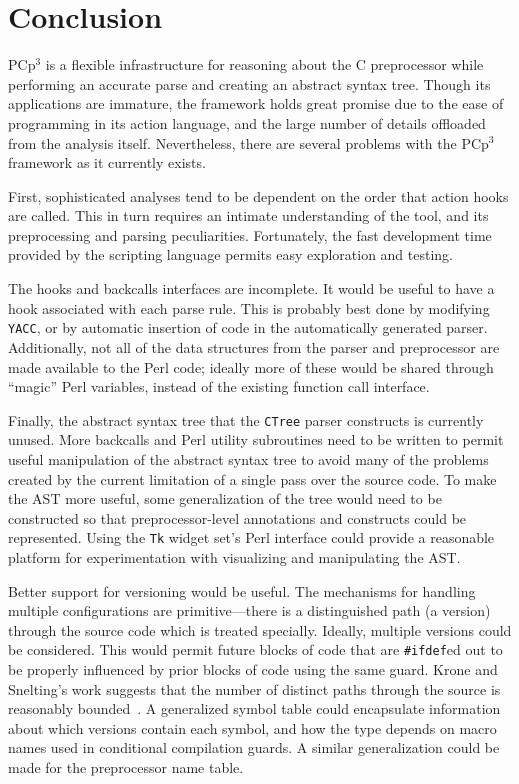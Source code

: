 \documentclass{article}
\newcommand{\pcp}{\mbox{\textsf{PCp}$^3$}}
\newcommand{\Perl}{\mbox{\textsf{Perl}}}
\newcommand{\C}{\mbox{\textsf{C}}}
\newcommand{\ppd}[1]{\texttt{\##1}}
\begin{document}
\section{Conclusion}
\label{sec:conclusion}
\pcp{} is a flexible infrastructure for
reasoning about the \C{} preprocessor while performing an
accurate parse and creating an abstract syntax tree.  Though its
applications are immature, the framework holds great promise due
to the ease of programming in its action language, and the large number
of details offloaded from the analysis itself.  Nevertheless, there are several
problems with the \pcp{} framework as it currently exists.

First, sophisticated analyses tend to be dependent on the order that
action hooks are called.  This in turn requires an intimate
understanding of the tool, and its preprocessing and parsing
peculiarities.  Fortunately, the fast development time provided by the
scripting language permits easy exploration and testing.

The hooks and backcalls interfaces are incomplete.  It would be useful
to have a hook associated with each parse rule.  This is probably best
done by modifying \texttt{YACC}, or by automatic insertion of code in
the automatically generated parser.  Additionally, not all of the data
structures from the parser and preprocessor are made available to the
\Perl{} code;  ideally more of these would be shared through ``magic''
\Perl{} variables, instead of the existing function call interface.

Finally, the abstract syntax tree that the \texttt{CTree} parser
constructs is currently unused.  More backcalls and \Perl{} utility
subroutines need to be written to permit useful manipulation of the
abstract syntax tree to avoid many of the problems created by the current
limitation of a single pass over the source code.  To make the AST
more useful, some generalization of the tree would need to be
constructed so that preprocessor-level annotations and constructs could be
represented.  Using the \texttt{Tk} widget set's \Perl{} interface could
provide a reasonable platform for experimentation with visualizing and
manipulating the AST.


Better support for versioning would be useful. The mechanisms for
handling multiple configurations are primitive---there is a
distinguished path (a version) through the source code which is treated
specially.  Ideally, multiple versions could be considered.  This would
permit future blocks of code that are \ppd{ifdef}ed out to be properly
influenced by prior blocks of code using the same guard.  Krone and
Snelting's work suggests that the number of distinct paths through the
source is reasonably bounded~\cite{Krone94}.  A generalized symbol table
could encapsulate information about which versions contain each symbol,
and how the type depends on macro names used in conditional compilation
guards.  A similar generalization could be made for the preprocessor
name table.
\end{document}
